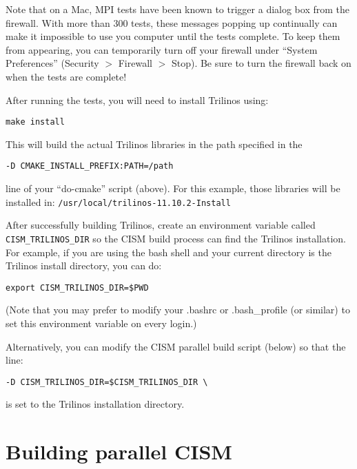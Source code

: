 \begin{mdframed}[style=mac] %
Note that on a Mac, MPI tests have been known to trigger a dialog box from the firewall. 
With more than 300 tests, these messages popping up continually can make it impossible 
to use you computer until the tests complete. To keep them from appearing, you can temporarily 
turn off your firewall under ``System Preferences'' (Security $>$ Firewall $>$ Stop). 
Be sure to turn the firewall back on when the tests are complete!
\end{mdframed}              %

After running the tests, you will need to install Trilinos using:

 \texttt{make install}

This will build the actual Trilinos libraries in the path specified in the

\begin{verbatim}
-D CMAKE_INSTALL_PREFIX:PATH=/path
\end{verbatim} 

line of your ``do-cmake'' script (above). For this example, those libraries will be 
installed in: \texttt{/usr/local/trilinos-11.10.2-Install}

After successfully building Trilinos, create an environment variable called \texttt{CISM\_TRILINOS\_DIR}
so the CISM build process can find the Trilinos installation.  For example, if you 
are using the bash shell and your current directory is the Trilinos install directory, you can do:
\begin{verbatim}
export CISM_TRILINOS_DIR=$PWD
\end{verbatim}
(Note that you may prefer to modify your .bashrc or .bash\_profile (or similar)
to set this environment variable on every login.)

Alternatively, you can modify the CISM parallel build script (below) so that the line:
\begin{verbatim}
-D CISM_TRILINOS_DIR=$CISM_TRILINOS_DIR \
\end{verbatim}
is set to the Trilinos installation directory.





\section{Building parallel CISM}

